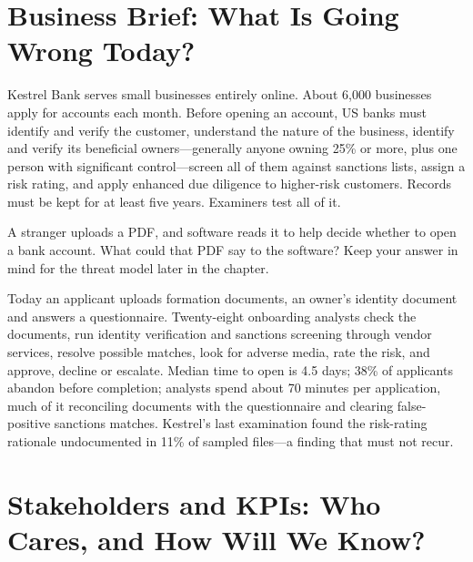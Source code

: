 \section{Business Brief: What Is Going Wrong Today?}
\label{sec:kyc-brief}

Kestrel Bank serves small businesses entirely online. About 6{,}000 businesses apply for accounts each month. Before opening an account, US banks must identify and verify the customer, understand the nature of the business, identify and verify its beneficial owners---generally anyone owning 25\% or more, plus one person with significant control---screen all of them against sanctions lists, assign a risk rating, and apply enhanced due diligence to higher-risk customers. Records must be kept for at least five years. Examiners test all of it.

\begin{thinkabout}
A stranger uploads a PDF, and software reads it to help decide whether to open a bank account. What could that PDF say to the software? Keep your answer in mind for the threat model later in the chapter.
\end{thinkabout}

Today an applicant uploads formation documents, an owner's identity document and answers a questionnaire. Twenty-eight onboarding analysts check the documents, run identity verification and sanctions screening through vendor services, resolve possible matches, look for adverse media, rate the risk, and approve, decline or escalate. Median time to open is 4.5 days; 38\% of applicants abandon before completion; analysts spend about 70 minutes per application, much of it reconciling documents with the questionnaire and clearing false-positive sanctions matches. Kestrel's last examination found the risk-rating rationale undocumented in 11\% of sampled files---a finding that must not recur.

\section{Stakeholders and KPIs: Who Cares, and How Will We Know?}
\label{sec:kyc-kpis}

